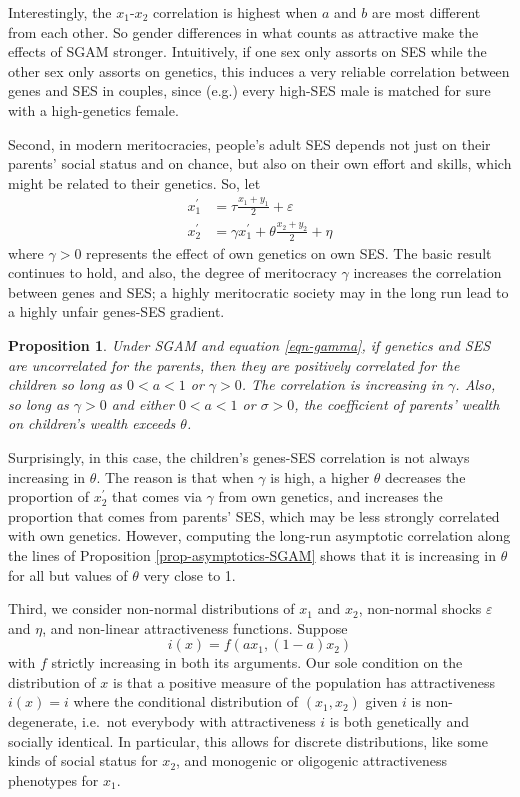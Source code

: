 \documentclass[
  12pt,
]{article}
\newtheorem{proposition}{Proposition}
\theoremstyle{definition}
\theoremstyle{definition}
\theoremstyle{definition}
\theoremstyle{definition}
\theoremstyle{remark}
\begin{document}
Interestingly, the \(x_1\)-\(x_2\) correlation is highest when \(a\) and \(b\) are most
different from each other. So gender differences in what counts as attractive
make the effects of SGAM stronger. Intuitively, if one sex only assorts on
SES while the other sex only assorts on genetics, this induces a very reliable
correlation between genes and SES in couples, since (e.g.) every high-SES male
is matched for sure with a high-genetics female.

Second, in modern meritocracies, people's adult SES depends not just
on their parents' social status and on chance, but also on their own effort and
skills, which might be related to their genetics. So, let
\begin{align}
x^\prime_1 &= \tau \frac{x_{1} + y_{1}}{2} + \varepsilon   \nonumber \\
x^\prime_2 &= \gamma x^\prime_1 + \theta \frac{x_{2}+y_{2}}{2}+\eta \label{eqn-gamma}
\end{align}
where \(\gamma > 0\) represents the effect of own genetics on own SES.
The basic result continues to hold, and also, the degree of meritocracy \(\gamma\)
increases the correlation between genes and SES; a highly meritocratic
society may in the long run lead to a highly unfair genes-SES gradient.

\begin{proposition}\label{prop-gamma}
Under SGAM and equation \eqref{eqn-gamma}, if genetics and SES are 
uncorrelated for the parents, then they
are positively correlated for the children so long as $0 < a < 1$ or
$\gamma > 0$. The correlation is increasing in $\gamma$. Also, so 
long as $\gamma > 0$ and either $0 < a < 1$ or $\sigma > 0$, the coefficient 
of parents' wealth on children's wealth exceeds $\theta$.
\end{proposition}

Surprisingly, in this case, the children's genes-SES correlation is not always
increasing in \(\theta\). The reason is that when \(\gamma\) is high, a higher
\(\theta\) decreases the proportion of \(x^\prime_2\) that comes via \(\gamma\) from
own genetics, and increases the proportion that comes from parents' SES, which
may be less strongly correlated with own genetics. However,
computing the long-run asymptotic correlation along the lines of Proposition
\ref{prop-asymptotics-SGAM} shows that it is increasing in \(\theta\) for
all but values of \(\theta\) very close to 1.

Third, we consider non-normal distributions of \(x_1\) and \(x_2\), non-normal
shocks \(\varepsilon\) and \(\eta\), and non-linear attractiveness functions. Suppose
\begin{equation}\label{non-linear-f} 
i(x) = f(ax_1, (1-a)x_2) 
\end{equation}
with \(f\) strictly increasing in both its arguments. Our sole condition on the
distribution of \(x\) is that a positive measure of the population has
attractiveness \(i(x) = i\) where the conditional distribution of \((x_1, x_2)\) given
\(i\) is non-degenerate, i.e.~not everybody with attractiveness \(i\) is both genetically
and socially identical. In particular, this allows for discrete distributions,
like some kinds of social status for \(x_2\), and monogenic or oligogenic attractiveness
phenotypes for \(x_1\).
\end{document}
